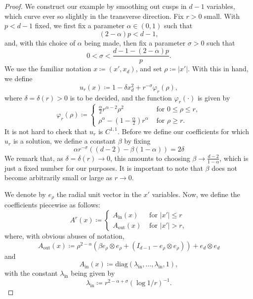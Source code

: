 \documentclass[reqno]{amsart}
\numberwithin{equation}{section}
\numberwithin{equation}{section}
\newcommand{\vphi}{\varphi}
\newcommand{\ds}{\displaystyle}
\newcounter{case}
\begin{document}
\begin{proof}
We construct our example by smoothing out cusps in $d-1$ variables, which curve ever so slightly in the transverse direction. Fix $r>0$ small. With $p<d-1$ fixed, we first fix a parameter $\alpha \in (0,1)$ such that 
\begin{equation}\label{eq: alphaeq} (2-\alpha)p < d-1,
\end{equation}
and, with this choice of $\alpha$ being made, then fix a parameter $\sigma>0$ such that
\begin{equation}
    \label{eq: sigmaeq}
    0<\sigma < \frac{d-1 - (2-\alpha)p}{p}.
\end{equation}
We use the familiar notation $x\coloneqq (x', x_d)$, and set $\rho \coloneqq |x'|$. With this in hand, we define
$$u_{r}(x) \coloneqq 1-\delta x_d^2 + r^{-\sigma} \vphi_r(\rho),$$
where $\delta = \delta(r)>0$ is to be decided, and the function $\vphi_r(\cdot)$ is given by 
$$\vphi_r(\rho) \coloneqq \begin{cases}
    \frac\alpha2 r^{\alpha -2} \rho^2 & \text{ for }  0 \le \rho \le r,\\
    \rho^\alpha - \left(1-\frac\alpha2\right)r^\alpha & \text{ for } \rho \ge r.
\end{cases}$$
It is not hard to check that $u_r$ is $C^{1,1}$. Before we define our coefficients for which $u_r$ is a solution, we define a constant $\beta$ by fixing
\begin{equation}
\label{eq: betaeq}
    \alpha r^{-\sigma}((d-2) -\beta(1-\alpha)) = 2\delta
\end{equation}
We remark that, as $\delta = \delta(r) \to 0$, this amounts to choosing $\beta \to \frac{d-2}{1-\alpha}$, which is just a fixed number for our purposes. It is important to note that $\beta$ does not become arbitrarily small or large as $r\to 0$. 

We denote by $e_\rho$ the radial unit vector in the $x'$ variables. Now, we define the coefficients piecewise as follows:
$$A^r(x)\coloneqq \begin{cases} A_{\text{in}}(x) & \text{ for } |x'| \le r\\
A_{\text{out}}(x) & \text{ for } |x'|>r,
\end{cases}$$
where, with obvious abuses of notation,
$$A_{\text{out}}(x) \coloneqq \rho^{2-\alpha}\left(\beta e_\rho\otimes e_\rho + (I_{d-1} - e_\rho \otimes e_\rho)\right) + e_d \otimes e_d$$
and
$$A_{\text{in}}(x) \coloneqq 
\text{diag}(\lambda_{\text{in}}, \ldots, \lambda_{\text{in}}, 1),$$
with the constant $\lambda_{\text{in}}$ being given by 
$$\lambda_{\text{in}} \coloneq \ds r^{2-\alpha +\sigma}(\log 1/r)^{-1}.$$


\end{proof}
\end{document}
